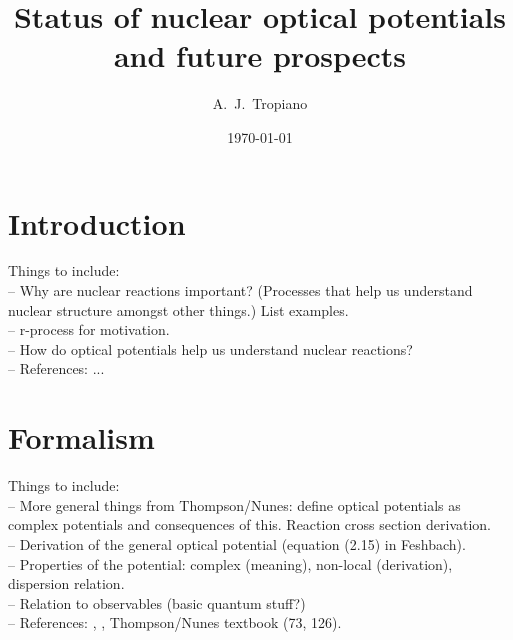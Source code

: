 \documentclass[preprintnumbers,floatfix,aps,prc,preprint,nofootinbib]{revtex4-1}
\begin{document}
\title{Status of nuclear optical potentials and future prospects}


\author{A.~J.~Tropiano}


\date{\today}

\maketitle

\newpage


\section{Introduction}
\label{sec:intro}


Things to include:
\\
-- Why are nuclear reactions important? (Processes that help us understand nuclear structure amongst other things.) List examples.
\\
-- r-process for motivation.
\\
-- How do optical potentials help us understand nuclear reactions?
\\
-- References: ...


\section{Formalism}
\label{sec:formalism}


Things to include:
\\
-- More general things from Thompson/Nunes: define optical potentials as complex potentials and consequences of this. Reaction cross section derivation.
\\
-- Derivation of the general optical potential (equation (2.15) in Feshbach).
\\
-- Properties of the potential: complex (meaning), non-local (derivation), dispersion relation.
\\
-- Relation to observables (basic quantum stuff?)
\\
-- References: \cite{Feshbach:1958nx}, \cite{Feshbach:1962ut}, Thompson/Nunes textbook (73, 126).


\end{document}
